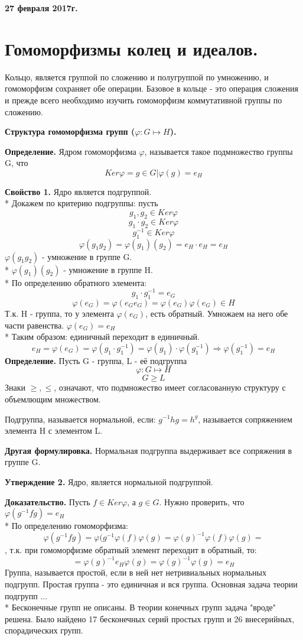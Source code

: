 \documentclass{article}
\begin{document}
\textbf {27 февраля 2017г.}
\section*{Гомоморфизмы колец и идеалов.} 
Кольцо, является группой по сложению и полугруппой по умножению, и гомоморфизм сохраняет обе операции. Базовое в кольце - это операция сложения и прежде всего необходимо изучить гомоморфизм коммутативной группы по сложению.

{\bf Структура гомоморфизма групп ($\varphi:G\mapsto H$).}

{\bf Определение.} Ядром гомоморфизма $\varphi$, называется такое подмножество группы G, что $$Ker\varphi={g\in G| \varphi(g)=e_H}$$

{\bf Свойство 1.} Ядро является подгруппой.\\*
Докажем по критерию подгруппы: пусть $$g_1,g_2\in Ker\varphi$$
$$g_1\cdot g_2\in Ker\varphi$$
$$g^{-1}_1 \in Ker\varphi$$
$$\varphi(g_1g_2)=\varphi(g_1)(g_2)=e_H\cdot e_H=e_H$$
$\varphi(g_1g_2)$ - умножение в группе G.\\*
$\varphi(g_1)(g_2)$ - умножение в группе H.\\*
По определению обратного элемента: $$g_1\cdot g^{-1}_1=e_G$$
$$\varphi(e_G)=\varphi(e_Ge_G)=\varphi(e_G)\varphi(e_G) \in H$$
Т.к. H - группа, то у элемента $\varphi(e_G)$, есть обратный. Умножаем на него обе части равенства. $\varphi(e_G)=e_H$\\*
Таким образом: единичный переходит в единичный.
$$e_H=\varphi(e_G)=\varphi(g_1\cdot g^{-1}_1)=\varphi(g_1)\cdot\varphi(g^{-1}_1)\Rightarrow\varphi(g^{-1}_1)=e_H$$
{\bf Определение.} Пусть G - группа, L - её подгруппа $$\varphi:G\mapsto H$$
$$G\ge L$$
Знаки $\ge,\le$, означают, что подмножество имеет согласованную структуру с объемлющим множеством.

Подгруппа, называется нормальной, если: $g^{-1}hg=h^g$, называется сопряжением элемента H с элементом L.

{\bf Другая формулировка.} Нормальная подгруппа выдерживает все сопряжения в группе G.

{\bf Утверждение 2.} Ядро, является нормальной подгруппой.

{\bf Доказательство.} Пусть $f\in Ker\varphi$, а $g\in G$.
Нужно проверить, что $\varphi(g^{-1}fg)=e_H$\\*
По определению гомоморфизма: $$\varphi(g^{-1}fg)=\varphi(g^{-1}\varphi(f)\varphi(g)=\varphi(g)^{-1}\varphi(f)\varphi(g)=$$, т.к. при гомоморфизме обратный элемент переходит в обратный, то: $$=\varphi(g)^{-1}e_H\varphi(g)=\varphi(g)^{-1}\varphi(g)=e_H$$
Группа, называется простой, если в ней нет нетривиальных нормальных подгрупп. Простая группа - это единичная и вся группа. Основная задача теории подгрупп ...\\*
Бесконечные групп не описаны. В теории конечных групп задача "вроде" решена. Было найдено 17 бесконечных серий простых групп и 26 внесерийных, спорадических групп.
\end{document}
